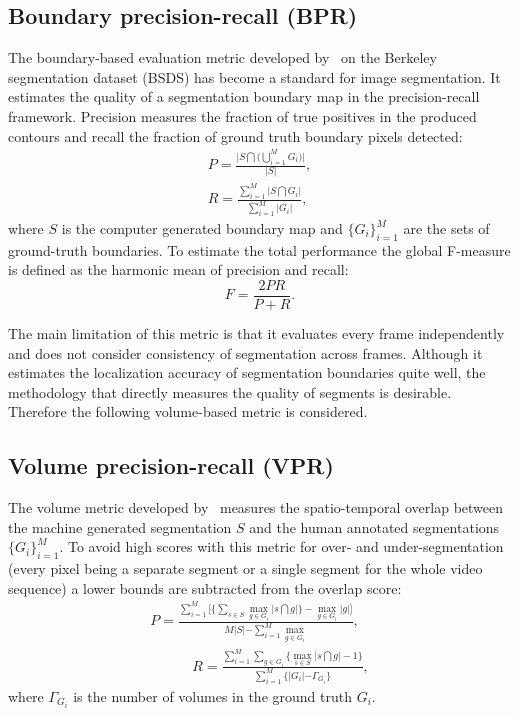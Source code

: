 \subsection{Boundary precision-recall (BPR)}
The boundary-based evaluation metric developed by~\cite{Martin01,Arbelaez11} on the Berkeley segmentation dataset (BSDS) has become a standard for image segmentation. It estimates the quality of a segmentation boundary map
in the precision-recall framework. Precision measures the fraction of true positives in the produced contours and recall the fraction of ground truth boundary pixels detected:
\begin{equation*}
\begin{aligned}
 P=\frac{ \lvert S\bigcap \bigr ( \bigcup_{i=1}^M G_i \bigl ) \rvert}{\rvert S \lvert},\\
 R =\frac{ \sum_{i=1}^M \lvert S\bigcap G_i \rvert}{\sum_{i=1}^M\rvert G_i \lvert},
\end{aligned}
\end{equation*}
where $S$ is the computer generated boundary map and $\{ G_i\}_{i=1}^M$ are the sets of ground-truth boundaries.
To estimate the total performance the global F-measure is defined as the harmonic mean of precision and recall:
\begin{equation*}
 F = \frac{2PR}{P+R}.
\end{equation*}

The main limitation of this metric is that it evaluates every frame independently and does not consider consistency of segmentation across frames. Although it estimates the localization accuracy of segmentation boundaries quite well,
the methodology that directly measures the quality of segments is desirable. Therefore the following volume-based metric is considered.
\subsection{Volume precision-recall (VPR)}
The volume metric developed by~\cite{Galasso13} measures the spatio-temporal overlap between the machine generated segmentation $S$ and the human annotated segmentations $\{ G_i\}_{i=1}^M$. 
To avoid high scores with this metric for over- and under-segmentation (every pixel being a separate segment or a single segment for the whole video sequence) a lower bounds are subtracted from the overlap score: 
\begin{equation*}
\begin{aligned}
 P=\frac{ \sum_{i=1}^M \bigl [ \{ \sum_{s\in S} \max_{g \in G_i} \lvert s \bigcap g \rvert\} - \max_{g \in G_i} \rvert g\lvert \bigr ]}{M\rvert S \lvert - \sum_{i=1}^M \max_{g \in G_i}},\\
\qquad
\quad
 R =\frac{ \sum_{i=1}^M  \sum_{g\in G_i} \{\max_{s \in S} \lvert s\bigcap g \rvert-1 \}}{\sum_{i=1}^M \{ \rvert G_i \lvert - \Gamma_{G_i} \}},
\end{aligned}
\end{equation*}
where $\Gamma_{G_i}$ is the number of volumes in the ground truth $G_i$.


